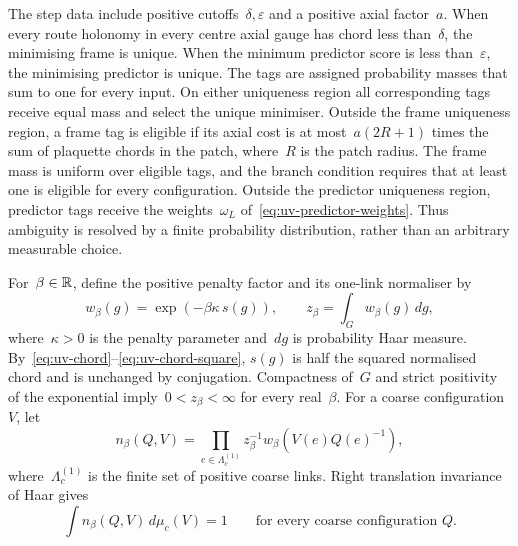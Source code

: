 The step data include positive cutoffs~$\delta,\varepsilon$ and a positive axial factor~$a$. When every route holonomy in every centre axial gauge has chord less than~$\delta$, the minimising frame is unique. When the minimum predictor score is less than~$\varepsilon$, the minimising predictor is unique. The tags are assigned probability masses that sum to one for every input. On either uniqueness region all corresponding tags receive equal mass and select the unique minimiser. Outside the frame uniqueness region, a frame tag is eligible if its axial cost is at most~$a(2R+1)$ times the sum of plaquette chords in the patch, where~$R$ is the patch radius. The frame mass is uniform over eligible tags, and the branch condition requires that at least one is eligible for every configuration. Outside the predictor uniqueness region, predictor tags receive the weights~$\omega_L$ of~\eqref{eq:uv-predictor-weights}. Thus ambiguity is resolved by a finite probability distribution, rather than an arbitrary measurable choice.

For~$\beta\in\mathbb R$, define the positive penalty factor and its one-link normaliser by
\begin{equation}\label{eq:uv-block-penalty}
 w_\beta(g)=\exp\!\left(-\beta\kappa\,s(g)\right),\qquad
 z_\beta=\int_G w_\beta(g)\,dg,
\end{equation}
where~$\kappa>0$ is the penalty parameter and~$dg$ is probability Haar measure. By~\eqref{eq:uv-chord}--\eqref{eq:uv-chord-square}, $s(g)$ is half the squared normalised chord and is unchanged by conjugation. Compactness of~$G$ and strict positivity of the exponential imply~$0<z_\beta<\infty$ for every real~$\beta$.
For a coarse configuration~$V$, let
\begin{equation}\label{eq:uv-block-noise}
 n_\beta(Q,V)=\prod_{e\in\Lambda_c^{(1)}}z_\beta^{-1}
                 w_\beta\!\left(V(e)Q(e)^{-1}\right),
\end{equation}
where~$\Lambda_c^{(1)}$ is the finite set of positive coarse links. Right translation invariance of Haar gives
\begin{equation}\label{eq:uv-block-noise-mass}
 \int n_\beta(Q,V)\,d\mu_c(V)=1
 \qquad\text{for every coarse configuration }Q.
\end{equation}

